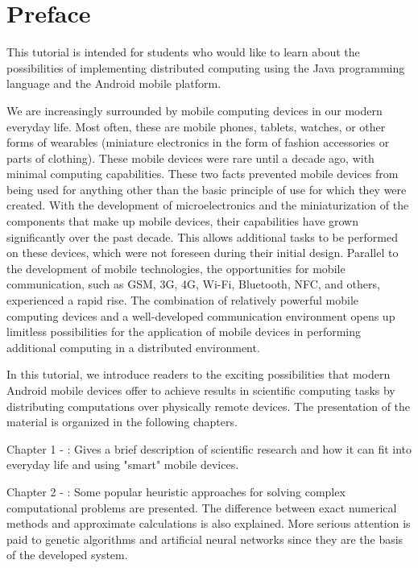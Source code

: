 \newpage
{}
\chapter*{Preface}

This tutorial is intended for students who would like to learn about the possibilities of implementing distributed computing using the Java programming language and the Android mobile platform.

We are increasingly surrounded by mobile computing devices in our modern everyday life. Most often, these are mobile phones, tablets, watches, or other forms of wearables (miniature electronics in the form of fashion accessories or parts of clothing). These mobile devices were rare until a decade ago, with minimal computing capabilities. These two facts prevented mobile devices from being used for anything other than the basic principle of use for which they were created. With the development of microelectronics and the miniaturization of the components that make up mobile devices, their capabilities have grown significantly over the past decade. This allows additional tasks to be performed on these devices, which were not foreseen during their initial design. Parallel to the development of mobile technologies, the opportunities for mobile communication, such as GSM, 3G, 4G, Wi-Fi, Bluetooth, NFC, and others, experienced a rapid rise. The combination of relatively powerful mobile computing devices and a well-developed communication environment opens up limitless possibilities for the application of mobile devices in performing additional computing in a distributed environment.

In this tutorial, we introduce readers to the exciting possibilities that modern Android mobile devices offer to achieve results in scientific computing tasks by distributing computations over physically remote devices. The presentation of the material is organized in the following chapters.

Chapter 1 - : Gives a brief description of scientific research and how it can fit into everyday life and using "smart" mobile devices.

Chapter 2 - : Some popular heuristic approaches for solving complex computational problems are presented. The difference between exact numerical methods and approximate calculations is also explained. More serious attention is paid to genetic algorithms and artificial neural networks since they are the basis of the developed system.

